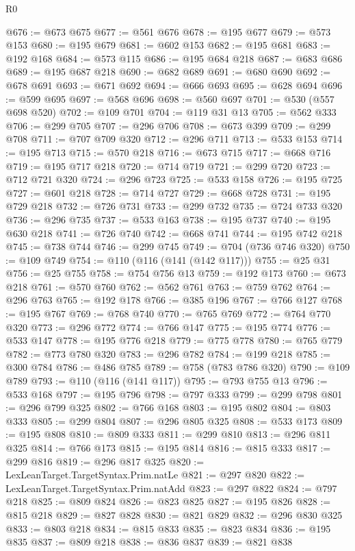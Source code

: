 \begin{lexlean}{R0}
\begin{coremodule}
@676 := @673 @675
@677 := @561 @676
@678 := @195 @677
@679 := @573 @153
@680 := @195 @679
@681 := @602 @153
@682 := @195 @681
@683 := @192 @168
@684 := @573 @115
@686 := @195 @684 @218
@687 := @683 @686
@689 := @195 @687 @218
@690 := @682 @689
@691 := @680 @690
@692 := @678 @691
@693 := @671 @692
@694 := @666 @693
@695 := @628 @694
@696 := @599 @695
@697 := @568 @696
@698 := @560 @697
@701 := @530 (@557 @698 @520)
@702 := @109 @701
@704 := @119 @31 @13
@705 := @562 @333
@706 := @299 @705
@707 := @296 @706
@708 := @673 @399
@709 := @299 @708
@711 := @707 @709 @320
@712 := @296 @711
@713 := @533 @153
@714 := @195 @713
@715 := @570 @218
@716 := @673 @715
@717 := @668 @716
@719 := @195 @717 @218
@720 := @714 @719
@721 := @299 @720
@723 := @712 @721 @320
@724 := @296 @723
@725 := @533 @158
@726 := @195 @725
@727 := @601 @218
@728 := @714 @727
@729 := @668 @728
@731 := @195 @729 @218
@732 := @726 @731
@733 := @299 @732
@735 := @724 @733 @320
@736 := @296 @735
@737 := @533 @163
@738 := @195 @737
@740 := @195 @630 @218
@741 := @726 @740
@742 := @668 @741
@744 := @195 @742 @218
@745 := @738 @744
@746 := @299 @745
@749 := @704 (@736 @746 @320)
@750 := @109 @749
@754 := @110 (@116 (@141 (@142 @117)))
@755 := @25 @31
@756 := @25 @755
@758 := @754 @756 @13
@759 := @192 @173
@760 := @673 @218
@761 := @570 @760
@762 := @562 @761
@763 := @759 @762
@764 := @296 @763
@765 := @192 @178
@766 := @385 @196
@767 := @766 @127
@768 := @195 @767
@769 := @768 @740
@770 := @765 @769
@772 := @764 @770 @320
@773 := @296 @772
@774 := @766 @147
@775 := @195 @774
@776 := @533 @147
@778 := @195 @776 @218
@779 := @775 @778
@780 := @765 @779
@782 := @773 @780 @320
@783 := @296 @782
@784 := @199 @218
@785 := @300 @784
@786 := @486 @785
@789 := @758 (@783 @786 @320)
@790 := @109 @789
@793 := @110 (@116 (@141 @117))
@795 := @793 @755 @13
@796 := @533 @168
@797 := @195 @796
@798 := @797 @333
@799 := @299 @798
@801 := @296 @799 @325
@802 := @766 @168
@803 := @195 @802
@804 := @803 @333
@805 := @299 @804
@807 := @296 @805 @325
@808 := @533 @173
@809 := @195 @808
@810 := @809 @333
@811 := @299 @810
@813 := @296 @811 @325
@814 := @766 @173
@815 := @195 @814
@816 := @815 @333
@817 := @299 @816
@819 := @296 @817 @325
@820 := LexLeanTarget.TargetSyntax.Prim.natLe
@821 := @297 @820
@822 := LexLeanTarget.TargetSyntax.Prim.natAdd
@823 := @297 @822
@824 := @797 @218
@825 := @809 @824
@826 := @823 @825
@827 := @195 @826
@828 := @815 @218
@829 := @827 @828
@830 := @821 @829
@832 := @296 @830 @325
@833 := @803 @218
@834 := @815 @833
@835 := @823 @834
@836 := @195 @835
@837 := @809 @218
@838 := @836 @837
@839 := @821 @838

\end{coremodule}
\end{lexlean}
